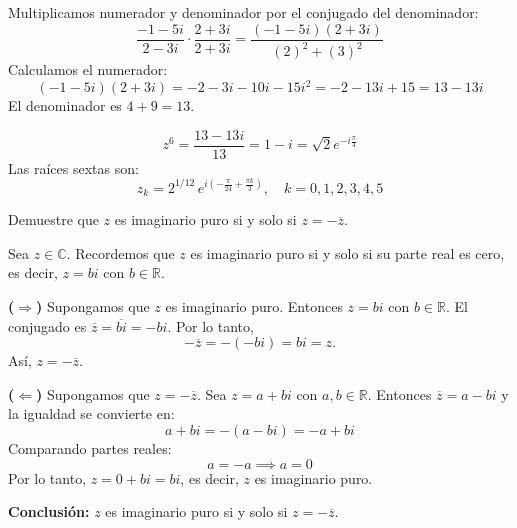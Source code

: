 \begin{prob}
\begin{myproof}
Multiplicamos numerador y denominador por el conjugado del denominador:
\[
\frac{-1 - 5i}{2 - 3i} \cdot \frac{2 + 3i}{2 + 3i} = \frac{(-1 - 5i)(2 + 3i)}{(2)^2 + (3)^2}
\]
Calculamos el numerador:
\[
(-1 - 5i)(2 + 3i) = -2 - 3i - 10i - 15i^2 = -2 - 13i + 15 = 13 - 13i
\]
El denominador es $4 + 9 = 13$.

\[
z^6 = \frac{13 - 13i}{13} = 1 - i = \sqrt{2} e^{-i\frac{\pi}{4}}
\]
Las raíces sextas son:
\[
\boxed{
z_k = 2^{1/12} \, e^{i\left( -\frac{\pi}{24} + \frac{\pi k}{3} \right ) }, \quad k=0,1,2,3,4,5
}
\]

\end{myproof}

\end{prob}

\begin{prob} 
Demuestre que $z$ es imaginario puro si y solo si $z=-\overline{z}$.
\begin{myproof}
Sea $z \in \mathbb{C}$. Recordemos que $z$ es imaginario puro si y solo si su parte real es cero, es decir, $z = bi$ con $b \in \mathbb{R}$.

\textbf{($\Rightarrow$)} Supongamos que $z$ es imaginario puro.  
Entonces $z = bi$ con $b \in \mathbb{R}$.  
El conjugado es $\overline{z} = \overline{bi} = -bi$.  
Por lo tanto,
\[
-\overline{z} = -(-bi) = bi = z.
\]
Así, $z = -\overline{z}$.

\textbf{($\Leftarrow$)} Supongamos que $z = -\overline{z}$.  
Sea $z = a + bi$ con $a, b \in \mathbb{R}$.  
Entonces $\overline{z} = a - bi$ y la igualdad se convierte en:
\[
a + bi = - (a - bi) = -a + bi
\]
Comparando partes reales:
\[
a = -a \implies a = 0
\]
Por lo tanto, $z = 0 + bi = bi$, es decir, $z$ es imaginario puro.

\textbf{Conclusión:}  
$z$ es imaginario puro si y solo si $z = -\overline{z}$.
\end{myproof}

\end{prob}